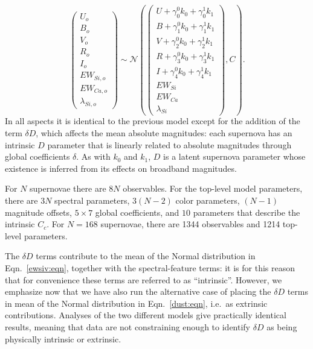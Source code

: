 \documentclass{aastex61}   	%
\begin{document}
\begin{equation}
\begin{pmatrix}
U_o\\B_o\\ V_o\\R_o\\I_o\\EW_{Si, o}\\ EW_{Ca, o} \\ \lambda_{Si, o}
\end{pmatrix}
\sim \mathcal{N}
\left(
\begin{pmatrix}
U +\gamma^0_{0} k_0 +\gamma^1_{0} k_1 \\B +\gamma^0_{1} k_0 +\gamma^1_{1} k_1 \\
V+\gamma^0_{2} k_0+\gamma^1_{2} k_1\\R+\gamma^0_{3} k_0 + \gamma^1_{3} k_1\\I+\gamma^0_{4} k_0+\gamma^1_{4} k_1\\
EW_{Si}\\ EW_{Ca} \\ \lambda_{Si}
\end{pmatrix}
,C
\right).
\label{dust:eqn}
\end{equation}
In all aspects it is identical to the previous model except for the addition of the term $\delta D$,
which affects the mean
absolute magnitudes:
each supernova has an intrinsic $D$ parameter that is linearly related to
absolute magnitudes through global coefficients $\delta$.  As with $k_0$ and $k_1$,  $D$ is a latent supernova parameter whose existence is inferred from
its effects on broadband magnitudes.


\color{red}
For $N$ supernovae there are $8N$ observables.  For the top-level model parameters, there are $3N$ spectral parameters, $3(N-2)$
color parameters, $(N-1)$ magnitude offsets,  $5 \times 7$ global coefficients, and $10$ parameters that describe the intrinsic
$C_c$.  For $N=168$ supernovae, there are 1344 observables and 1214 top-level parameters.
\color{black}


\color{red}
The $\delta D$ terms contribute to the mean of the Normal distribution in Eqn.~\ref{ewsiv:eqn}, together with the spectral-feature terms:
it is for this reason that for convenience these terms are referred to as ``intrinsic''.
However, we emphasize now that we have also run the alternative case  of placing the
$\delta D$ terms in mean of the Normal distribution in Eqn.~\ref{dust:eqn}, i.e.\ as extrinsic contributions.
Analyses of the two different models give practically identical results, meaning that data are not constraining enough
to identify $\delta D$ as being physically intrinsic or extrinsic.
\color{black}
\end{document}

